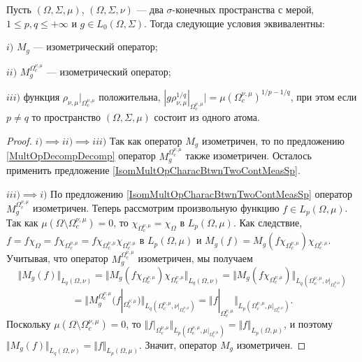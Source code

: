 \begin{proposition}\label{IsomMultOpCharacBtwnTwoMeasSp} Пусть $(\Omega,\Sigma,\mu)$, $(\Omega,\Sigma,\nu)$ --- два $\sigma$-конечных пространства с мерой, $1\leq p,q\leq +\infty$ и $g\in L_0(\Omega,\Sigma)$. Тогда следующие условия эквивалентны:

$i)$ $M_g$ --- изометрический оператор;

$ii)$ $M_g^{\Omega_c^{\nu,\mu}}$ --- изометрический оператор;

$iii)$ функция $\rho_{\nu,\mu}|_{\Omega_c^{\nu,\mu}}$ положительна, $|g  \rho_{\nu,\mu}^{1/q}|_{\Omega_c^{\nu,\mu}}|=\mu(\Omega_c^{\nu,\mu})^{1/p-1/q}$, при этом если $p\neq q$ то пространство $(\Omega,\Sigma,\mu)$ состоит из одного атома.
\end{proposition}
\begin{proof} $i)$$\implies$$ ii)$$\implies$$ iii)$ Так как оператор $M_g$ изометричен, то по предложению \ref{MultOpDecompDecomp} оператор $M_g^{\Omega_c^{\nu,\mu}}$ также изометричен. Осталось применить предложение \ref{IsomMultOpCharacBtwnTwoContMeasSp}.

$iii)$$\implies$$ i)$ По предложению \ref{IsomMultOpCharacBtwnTwoContMeasSp} оператор $M_g^{\Omega_c^{\nu,\mu}}$ изометричен. Теперь рассмотрим произвольную функцию $f\in L_p(\Omega,\mu)$. Так как $\mu(\Omega\setminus\Omega_c^{\nu,\mu})=0$, то $\chi_{\Omega_c^{\nu,\mu}}=\chi_{\Omega}$ в $L_p(\Omega,\mu)$. Как следствие, $f=f\chi_{\Omega}=f\chi_{\Omega_c^{\nu,\mu}}=f\chi_{\Omega_c^{\nu,\mu}}\chi_{\Omega_c^{\nu,\mu}}$ в $L_p(\Omega,\mu)$ и $M_g(f)=M_g(f\chi_{\Omega_c^{\nu,\mu}})\chi_{\Omega_c^{\nu,\mu}}$. Учитывая, что оператор $M_g^{\Omega_c^{\nu,\mu}}$ изометричен, мы получаем
$$
\Vert M_g(f)\Vert_{L_q(\Omega,\nu)}
=\Vert M_g(f\chi_{\Omega_c^{\nu,\mu}})\chi_{\Omega_c^{\nu,\mu}}\Vert_{L_q(\Omega,\nu)}
=\Vert M_g(f\chi_{\Omega_c^{\nu,\mu}})\Vert_{L_q(\Omega_c^{\nu,\mu},\nu|_{\Omega_c^{\nu,\mu}})}
$$
$$
=\Vert M_g^{\Omega_c^{\nu,\mu}}(f|_{\Omega_c^{\nu,\mu}})\Vert_{L_q(\Omega_c^{\nu,\mu},\nu|_{\Omega_c^{\nu,\mu}})}
=\Vert f|_{\Omega_c^{\nu,\mu}}\Vert_{L_p(\Omega_c^{\nu,\mu},\mu|_{\Omega_c^{\nu,\mu}})}.
$$
Поскольку $\mu(\Omega\setminus\Omega_c^{\nu,\mu})=0$, то $\Vert f|_{\Omega_c^{\nu,\mu}}\Vert_{L_p(\Omega_c^{\nu,\mu},\mu|_{\Omega_c^{\nu,\mu}})}=\Vert f\Vert_{L_p(\Omega,\mu)}$, и поэтому $\Vert M_g(f)\Vert_{L_q(\Omega,\nu)}=\Vert f\Vert_{L_p(\Omega,\mu)}$. Значит, оператор $M_g$ изометричен.
\end{proof}

